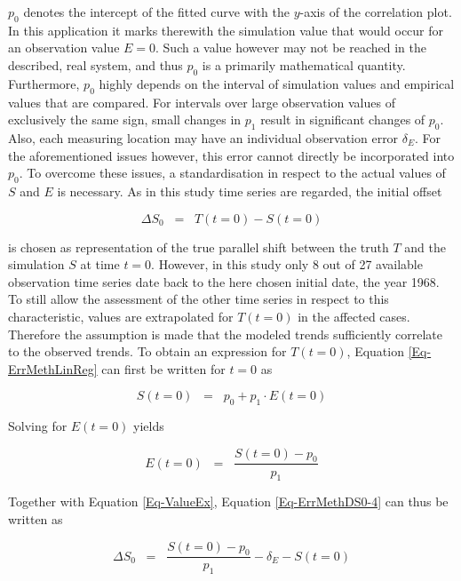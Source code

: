 $p_0$ denotes the intercept of the fitted curve with the $y$-axis of the correlation plot. 
In this application it marks therewith the simulation value that would occur for an observation value $E = 0$. 
Such a value however may not be reached in the described, real system, and thus $p_0$ is a primarily mathematical quantity. 
Furthermore, $p_0$ highly depends on the interval of simulation values and empirical values that are compared. 
For intervals over large observation values of exclusively the same sign, small changes in $p_1$ result in significant changes of $p_0$. 
Also, each measuring location may have an individual observation error $\delta_E$. 
For the aforementioned issues however, this error cannot directly be incorporated into $p_0$. 
To overcome these issues, a standardisation in respect to the actual values of $S$ and $E$ is necessary. 
As in this study time series are regarded, the initial offset

\begin{equation}
    \label{Eq-ErrMethDS0-1}
    \Delta S_0 \; \; = \; \; T(t\!=\!0) - S(t\!=\!0)
\end{equation}

\noindent is chosen as representation of the true parallel shift between the truth $T$ and the simulation $S$ at time $t\!=\!0$. 
However, in this study only 8 out of 27 available observation time series date back to the here chosen initial date, the year 1968. 
To still allow the assessment of the other time series in respect to this characteristic, values are extrapolated for $T(t\!=\!0)$ in the affected cases. 
Therefore the assumption is made that the modeled trends sufficiently correlate to the observed trends. 
To obtain an expression for $T(t\!=\!0)$, Equation \eqref{Eq-ErrMethLinReg} can first be written for $t\!=\!0$ as

\begin{equation}
    \label{Eq-ErrMethDS0-2}
    S(t\!=\!0) \; \; = \; \; p_0 + p_1 \cdot E(t\!=\!0)
\end{equation}

\noindent Solving for $E(t\!=\!0)$ yields

\begin{equation*}
    \label{Eq-ErrMethDS0-3}
    E(t\!=\!0) \; \; = \; \; \frac{S(t\!=\!0) - p_0}{p_1}
\end{equation*}

Together with Equation \eqref{Eq-ValueEx}, Equation \eqref{Eq-ErrMethDS0-4} can thus be written as

\begin{equation*}
    \label{Eq-ErrMethDS0-4}
    \Delta S_0 \; \; = \; \; \frac{S(t=0) - p_0}{p_1} - \delta_E - S(t\!=\!0)
\end{equation*}

